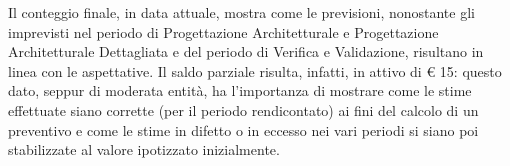 Il conteggio finale, in data attuale, mostra come le previsioni, nonostante gli imprevisti nel periodo di Progettazione Architetturale e Progettazione Architetturale Dettagliata e del periodo di Verifica e Validazione, risultano in linea con le aspettative. Il saldo parziale risulta, infatti, in attivo di € 15: questo dato, seppur di moderata entità, ha l'importanza di mostrare come le stime effettuate siano corrette (per il periodo rendicontato) ai fini del calcolo di un preventivo e come le stime in difetto o in eccesso nei vari periodi si siano poi stabilizzate al valore ipotizzato inizialmente.

